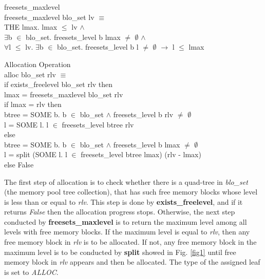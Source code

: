 \documentclass[runningheads]{llncs}
\begin{document}
\begin{definition} {freesets\_maxlevel}\\
freesets\_maxlevel blo\_set lv $\equiv$ \\
\phantom{x} \hspace{10pt} THE lmax. lmax $\leq$ lv $\wedge$ \\
\phantom{x} \hspace{60pt} $\exists$b $\in$ blo\_set. freesets\_level b lmax $\neq$ $\emptyset$ $\wedge$ \\
\phantom{x} \hspace{60pt} $\forall$l $\leq$ lv. $\exists$b $\in$ blo\_set. freesets\_level b l $\ne$ $\emptyset$ $\longrightarrow$ l $\leq$ lmax
\end{definition}

\begin{definition} {Allocation Operation} \\
alloc blo\_set rlv $\equiv$ \\
\phantom{x} \hspace{10pt} if exists\_freelevel blo\_set rlv then \\
\phantom{x} \hspace{20pt} lmax = freesets\_maxlevel blo\_set rlv \\
\phantom{x} \hspace{20pt} if lmax = rlv then \\
\phantom{x} \hspace{30pt} btree = SOME b. b $\in$ blo\_set $\wedge$ freesets\_level b rlv $\ne$ $\emptyset$ \\
\phantom{x} \hspace{30pt} l = SOME l. l $\in$ freesets\_level btree rlv \\
\phantom{x} \hspace{20pt} else \\
\phantom{x} \hspace{30pt} btree = SOME b. b $\in$ blo\_set $\wedge$ freesets\_level b lmax $\ne$ $\emptyset$ \\
\phantom{x} \hspace{30pt} l = split (SOME l. l $\in$ freesets\_level btree lmax) (rlv - lmax) \\
\phantom{x} \hspace{10pt} else False
\end{definition}

The first step of allocation is to check whether there is a quad-tree in \textsl{blo\_set} (the memory pool tree collection), that has such free memory blocks whose level is less than or equal to \textsl{rlv}. This step is done by \textbf{exists\_freelevel}, and if it returns \textsl{False} then the allocation progress stops. Otherwise, the next step conducted by \textbf{freesets\_maxlevel} is to return the maximum level among all levels with free memory blocks. If the maximum level is equal to \textsl{rlv}, then any free memory block in \textsl{rlv} is to be allocated. If not, any free memory block in the maximum level is to be conducted by \textbf{split} showed in Fig. \ref{fig1} until free memory block in \textsl{rlv} appears and then be allocated. The type of the assigned leaf is set to \textsl{ALLOC}.
\end{document}
